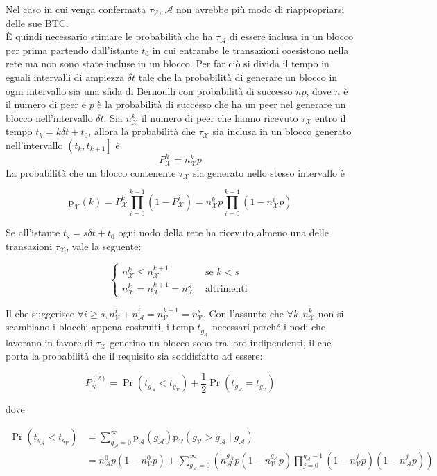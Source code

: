 Nel caso in cui venga confermata $\tau_\mathcal{V}$, $\mathcal{A}$ non avrebbe più modo di riappropriarsi delle sue BTC.\\
È quindi necessario stimare le probabilità che ha $\tau_\mathcal{A}$ di essere inclusa in un blocco per prima partendo dall'istante $t_0$ in cui entrambe le transazioni coesistono nella rete ma non sono state incluse in un blocco.
Per far ciò si divida il tempo in eguali intervalli di ampiezza $\delta t$ tale che la probabilità di generare un blocco in ogni intervallo sia una sfida di Bernoulli con probabilità di successo $np$, dove $n$ è il numero di peer e $p$ è la probabilità di successo che ha un peer nel generare un blocco nell'intervallo $\delta t$. Sia $n^k_\mathcal{X}$ il numero di peer che hanno ricevuto $\tau_\mathcal{X}$ entro il tempo $t_k = k \delta t + t_0$, allora la probabilità che $\tau_\mathcal{X}$ sia inclusa in un blocco generato nell'intervallo $\left( t_k , t_{k+1} \right]$ è
\[P^k_\mathcal{X} = n^k_\mathcal{X} p \]
La probabilità che un blocco contenente $\tau_\mathcal{X}$ sia generato nello stesso intervallo è

\[ \textrm{p}_\mathcal{X}(k) = P^k_\mathcal{X} \prod^{k-1}_{i=0} \left(1 - P^i_\mathcal{X} \right) = n^k_\mathcal{X} p \prod^{k-1}_{i=0} \left(1 - n^i_\mathcal{X} p \right)  \]

Se all'istante $t_s = s \delta t + t_0$ ogni nodo della rete ha ricevuto almeno una delle transazioni $\tau_\mathcal{X}$, vale la seguente:

\[
\begin{cases}
  n^k_\mathcal{X} \leq n^{k+1}_\mathcal{X} &\textrm{ se } k < s \\
  n^k_\mathcal{X} = n^{k+1}_\mathcal{X} = n^s_\mathcal{X} &\textrm{ altrimenti}
\end{cases}
\]

Il che suggerisce $\forall i \geq s, n^i_\mathcal{V} + n^i_\mathcal{A} = n^{k+1}_\mathcal{V} = n^s_\mathcal{V}$.
Con l'assunto che $\forall k , n^k_\mathcal{X}$ non si scambiano i blocchi appena costruiti, i temp $t_{g_\mathcal{X}}$ necessari perché i nodi che lavorano in favore di $\tau_\mathcal{X}$ generino un blocco sono tra loro indipendenti, il che porta la probabilità che il requisito sia soddisfatto ad essere:

\[ P^{\left(2\right)}_S = \Pr \left( t_{g_\mathcal{A}} < t_{g_\mathcal{V}} \right) + \frac{1}{2}\Pr \left( t_{g_\mathcal{A}} = t_{g_\mathcal{V}} \right) \]

dove

\begin{align*}
\Pr \left( t_{g_\mathcal{A}} < t_{g_\mathcal{V}} \right) &= \sum^{\infty}_{g_\mathcal{A} = 0} \textrm{p}_\mathcal{A}\left(g_\mathcal{A}\right)\textrm{p}_\mathcal{V}\left(g_\mathcal{V} > g_\mathcal{A} \mid g_\mathcal{A} \right) \\
&= n^0_\mathcal{A}p\left(1 - n^0_\mathcal{V}p \right) + \sum^{\infty}_{g_\mathcal{A} = 0} \left( n^{g_\mathcal{A}}_\mathcal{A} p \left( 1 - n^{g_\mathcal{A}}_\mathcal{V} p \right) \prod^{g_\mathcal{A} -1}_{j=0} \left( 1 - n^j_\mathcal{V} p \right) \left(1 - n^j_\mathcal{A} p \right) \right)
\end{align*}

